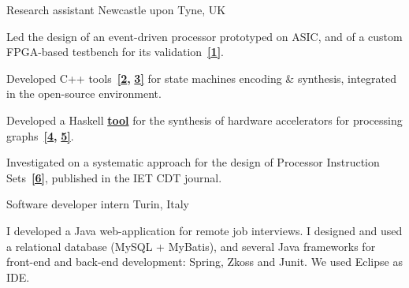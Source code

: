 \begin{cventries}
\cventry
{}
{\vspace{-9mm}Research assistant } %
{\vspace{-9mm} \normalcolor Newcastle upon Tyne, UK} %
{}
{	
\begin{cvitems}
\item {Led the design of an event-driven processor prototyped on 
ASIC, and of a custom FPGA-based testbench for its
validation~{\color{myblue}\href{https://github.com/tuura/papers/tree/master/date-2018}{\textbf{[1]}}}.}
\item {Developed C++
tools~{\color{myblue}\href{https://github.com/tuura/shutters}{\textbf{[2}}}{\color{myblue}\textbf{,}}
{\color{myblue}\href{https://github.com/tuura/scenco}{\textbf{3]}}}
for state machines encoding \& synthesis, integrated in the open-source
\href{https://workcraft.org/}{} 
environment.}
\item {Developed a Haskell 
{\color{myblue}\href{https://github.com/tuura/fantasi/tree/master/doc}{\textbf{tool}}}
for the synthesis of hardware accelerators for processing 
graphs~{\color{myblue}\href{https://youtu.be/Z2w0hiHY3Us}{\textbf{[4}}}{\color{myblue}\textbf{,}}
{\color{myblue}\href{https://poets-project.org/publications}{\textbf{5]}}}.}
\item {Investigated on a systematic approach for the design of Processor 
Instruction 
Sets~{\color{myblue}\href{https://eprint.ncl.ac.uk/file_store/production/251075/92600BF7-92A0-4B22-897A-01892DDA9E2F.pdf}{\textbf{[6]}}},
 published in the IET CDT journal.}
\end{cvitems}
}
\vspace{-5mm}

\cventry
{}%
{\vspace{-9mm}Software developer intern }
{\vspace{-9mm} \normalcolor Turin, Italy}
{}
{
\begin{cvitems}
I developed a Java web-application for remote job interviews. I designed and 
used a relational database (MySQL + MyBatis), and several Java frameworks for 
front-end and back-end development: Spring, Zkoss and Junit. We used 
Eclipse as IDE.
\end{cvitems}
}


\end{cventries}
